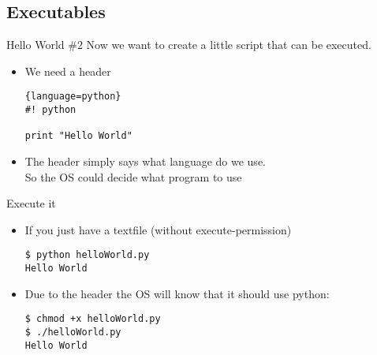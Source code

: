 \documentclass[hyperref={pdfpagelabels=false}]{beamer}
\begin{document}
    \subsection{Executables}
		\begin{frame}[fragile]{Hello World \#2}
            Now we want to create a little script that can be executed.
			\begin{itemize}
                \item<1-> We need a header
                \begin{lstlisting}{language=python}
#! python

print "Hello World"
\end{lstlisting}
                \item<2-> The header simply says what language do we use. \\
                    So the OS could decide what program to use
\end{itemize}
		\end{frame}
		\begin{frame}[fragile]{Execute it}
			\begin{itemize}
                \item<1-> If you just have a textfile (without execute-permission)
                \begin{lstlisting}
$ python helloWorld.py
Hello World
\end{lstlisting}
                \item<2-> Due to the header the OS will know that it should use python:
                \begin{lstlisting}
$ chmod +x helloWorld.py
$ ./helloWorld.py
Hello World
\end{lstlisting}
            \end{itemize}
		\end{frame}
\end{document}
